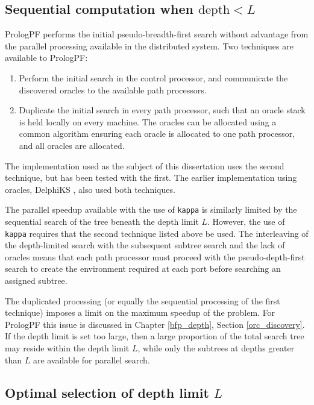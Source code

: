 \subsection{Sequential computation when $\mbox{depth}<L$}

PrologPF
performs the initial pseudo-breadth-first search without advantage from
the parallel processing available in the distributed system.  Two techniques are
available to PrologPF:
\begin{enumerate}
\item{Perform the initial search in the control processor, and communicate the
  discovered oracles to the available path processors.}
\item{Duplicate the initial search in every path processor, such that an oracle
  stack is held locally on every machine.  The oracles can be allocated using a
  common algorithm ensuring each oracle is allocated to one path processor, and
  all oracles are allocated.}
\end{enumerate}
The implementation used as the subject of this dissertation uses the second
technique, but has been tested with the first.  The earlier implementation
using oracles, DelphiKS \cite{Kle91, Sar95}, also used both techniques.

The parallel speedup available with the use of \texttt{kappa} is similarly
limited by the sequential search of the tree beneath the depth limit $L$.
However, the use of \texttt{kappa} requires that the second technique listed
above be used.  The interleaving of the depth-limited search with the 
subsequent subtree search and the lack of oracles means that each path processor
must proceed with the pseudo-depth-first search to create the environment
required at each port before searching an assigned subtree.

The duplicated processing (or equally the sequential processing of the first
technique) imposes a limit on the maximum speedup of the problem.  For PrologPF
this issue is discussed in Chapter \ref{bfp_depth}, Section \ref{orc_discovery}.
If the depth limit is set too large, then a large proportion of the total
search tree may reside within the depth limit $L$, while only the subtrees
at depths greater than $L$ are available for parallel search.

\subsection{Optimal selection of depth limit $L$}

